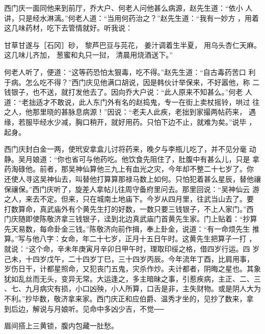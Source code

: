 西门庆一面同他来到前厅，乔大户、何老人问他甚么病源，赵先生道：“依小
人讲，只是经水淋漓。”何老人道：“当用何药治之？”赵先生道：“我有一妙方
，用着这几味药材，吃下去管情就好。听我说：

甘草甘遂与［石冈］砂，
黎芦巴豆与芫花，
姜汁调着生半夏，
用乌头杏仁天麻。
这几味儿齐加，
葱蜜和丸只一挝，
清晨用烧酒送下。”

何老人听了，便道：“这等药恐怕太狠毒，吃不得。”赵先生道：“自古毒药苦口
利于病。怎么吃不得？”西门庆见他满口胡说，因是韩伙计举保来，不好嚣他，称
二钱银子，也不送，就打发他去了。因向乔大户说：“此人原来不知甚么。”何老
人道：“老拙适才不敢说，此人东门外有名的赵捣鬼，专一在街上卖杖摇铃，哄过
往之人，他那里晓的甚脉息病源！”因说：“老夫人此疾，老拙到家撮两帖药来，
遇缘，若服毕经水少减，胸口稍开，就好用药。只怕下边不止，就难为矣。”说毕
，起身。

西门庆封白金一两，使玳安拿盒儿讨将药来，晚夕与李瓶儿吃了，并不见分毫
动静。吴月娘道：“你也省可与他药吃。他饮食先阻住了，肚腹中有甚么儿，只是
拿药淘碌他。前者，那吴神仙算他三九上有血光之灾，今年却不整二十七岁了。你
还使人寻这吴神仙去，叫替他打算算那禄马数上如何。只怕犯着甚么星辰，替他禳
保禳保。”西门庆听了，旋差人拿帖儿往周守备府里问去。那里回说：“吴神仙云
游之人，来去不定。但来，只在城南土地庙下。今岁从四月里，往武当山去了。要
打数算命，真武庙外有个黄先生打的好数，一数只要三钱银子，不上人家门。”西
门庆随即使陈敬济拿三钱银子，迳到北边真武庙门首黄先生家。门上贴着：“抄算
先天易数，每命卦金三钱。”陈敬济向前作揖，奉上卦金，说道：“有一命烦先生
推算。”写与他八字：女命，年二十七岁，正月十五日午时。这黄先生把算子一打
，就说：“这个命，辛未年庚寅月辛卯日甲午时，理取印绥之格，借四岁行运。四
岁己未，十四岁戊午，二十四岁丁巳，三十四岁丙辰。今年流年丁酉，比肩用事，
岁伤日干，计都星照命，又犯丧门五鬼，灾杀作炒。夫计都者，阴晦之星也。其象
犹如乱丝而无头，变异无常。大运逢之，多主暗昧之事，引惹疾病，主正、二、三
、七、九月病灾有损，小口凶殃，小人所算，口舌是非，主失财物。或是阴人大为
不利。”抄毕数，敬济拿来家。西门庆正和应伯爵、温秀才坐的，见抄了数来，拿
到后边，解说与月娘听。见命中多凶少吉，不觉──

眉间搭上三黄锁，腹内包藏一肚愁。